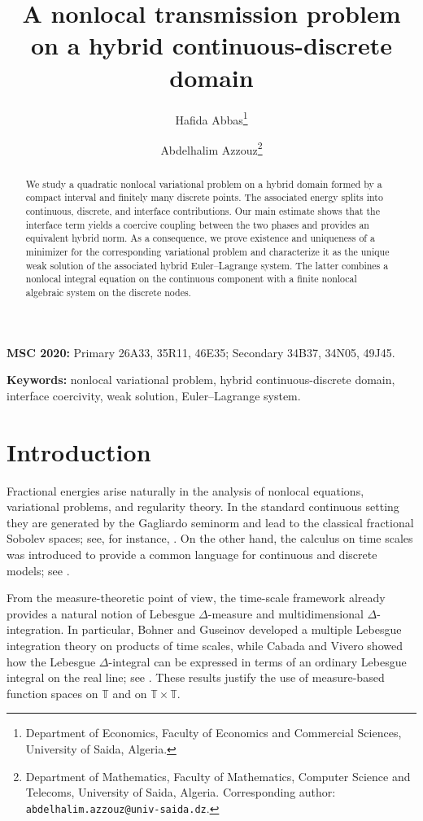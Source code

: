 \documentclass[11pt]{article}
\title{\textbf{A nonlocal transmission problem on a hybrid continuous-discrete domain}}
\author{Hafida Abbas\thanks{Department of Economics, Faculty of Economics and Commercial Sciences, University of Saida, Algeria.} \and Abdelhalim Azzouz\thanks{Department of Mathematics, Faculty of Mathematics, Computer Science and Telecoms, University of Saida, Algeria. Corresponding author: \texttt{abdelhalim.azzouz@univ-saida.dz}.}}
\date{}
\numberwithin{equation}{section}
\theoremstyle{definition}
\newcommand{\T}{\mathbb{T}}
\newcommand{\subjclass}[2][]{\par\smallskip\noindent\textbf{MSC 2020: }#2\par}
\newcommand{\keywords}[1]{\par\smallskip\noindent\textbf{Keywords: }#1\par}
\begin{document}
\maketitle

\begin{abstract}
We study a quadratic nonlocal variational problem on a hybrid domain formed by a compact interval and finitely many discrete points. The associated energy splits into continuous, discrete, and interface contributions. Our main estimate shows that the interface term yields a coercive coupling between the two phases and provides an equivalent hybrid norm. As a consequence, we prove existence and uniqueness of a minimizer for the corresponding variational problem and characterize it as the unique weak solution of the associated hybrid Euler--Lagrange system. The latter combines a nonlocal integral equation on the continuous component with a finite nonlocal algebraic system on the discrete nodes.
\end{abstract}

\subjclass[2020]{Primary 26A33, 35R11, 46E35; Secondary 34B37, 34N05, 49J45.}
\keywords{nonlocal variational problem, hybrid continuous-discrete domain, interface coercivity, weak solution, Euler--Lagrange system.}

\section{Introduction}

Fractional energies arise naturally in the analysis of nonlocal equations, variational problems, and regularity theory. In the standard continuous setting they are generated by the Gagliardo seminorm and lead to the classical fractional Sobolev spaces; see, for instance, \cite{DiNezza2012, Gagliardo1957, Slobodeckij1958}. On the other hand, the calculus on time scales was introduced to provide a common language for continuous and discrete models; see \cite{Hilger1990, BohnerPeterson2001, BohnerPeterson2003}.

From the measure-theoretic point of view, the time-scale framework already provides a natural notion of Lebesgue $\Delta$-measure and multidimensional $\Delta$-integration. In particular, Bohner and Guseinov developed a multiple Lebesgue integration theory on products of time scales, while Cabada and Vivero showed how the Lebesgue $\Delta$-integral can be expressed in terms of an ordinary Lebesgue integral on the real line; see \cite{BohnerGuseinov2006, CabadaVivero2006}. These results justify the use of measure-based function spaces on $\T$ and on $\T\times\T$.
\end{document}
